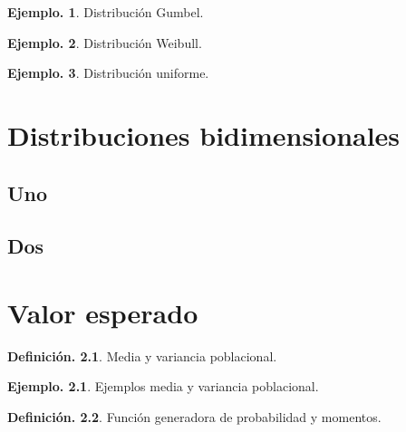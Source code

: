 \documentclass[]{book}
\theoremstyle{definition}
\newtheorem{definition}{Definición.}[chapter]
\theoremstyle{definition}
\newtheorem{example}{Ejemplo.}[chapter]
\theoremstyle{definition}
\theoremstyle{remark}
\begin{document}
\begin{example}
\protect\hypertarget{exm:unnamed-chunk-123}{}{\label{exm:unnamed-chunk-123} }
Distribución Gumbel.
\end{example}

\begin{example}
\protect\hypertarget{exm:unnamed-chunk-124}{}{\label{exm:unnamed-chunk-124} }Distribución Weibull.
\end{example}

\begin{example}
\protect\hypertarget{exm:unnamed-chunk-125}{}{\label{exm:unnamed-chunk-125} }Distribución uniforme.
\end{example}

\hypertarget{varbi}{%
\chapter{Distribuciones bidimensionales}\label{varbi}}

\hypertarget{uno}{%
\section{Uno}\label{uno}}

\hypertarget{dos}{%
\section{Dos}\label{dos}}

\hypertarget{expected}{%
\chapter{Valor esperado}\label{expected}}

\begin{definition}
\protect\hypertarget{def:unnamed-chunk-126}{}{\label{def:unnamed-chunk-126} }Media y variancia poblacional.
\end{definition}

\begin{example}
\protect\hypertarget{exm:unnamed-chunk-127}{}{\label{exm:unnamed-chunk-127} }Ejemplos media y variancia poblacional.
\end{example}

\begin{definition}
\protect\hypertarget{def:unnamed-chunk-128}{}{\label{def:unnamed-chunk-128} }Función generadora de probabilidad y momentos.
\end{definition}
\end{document}
